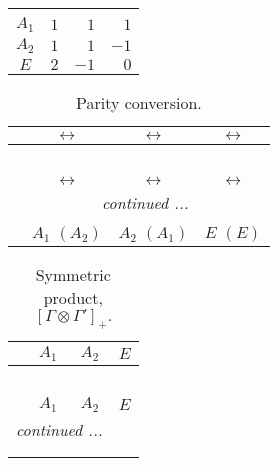 \documentclass[fleqn,10pt,landscape]{article}
\begin{document}
\begin{itemize}
\begin{center}
\begin{longtable}{c|rrr}
 \hline \hline
\multicolumn{3}{r}{} \\ \endlastfoot

$ A_{1} $ & $ 1 $ & $ 1 $ & $ 1 $ \\
$ A_{2} $ & $ 1 $ & $ 1 $ & $ -1 $ \\
$ E $ & $ 2 $ & $ -1 $ & $ 0 $ \\
\end{longtable}
\end{center}
\begin{center}
\renewcommand{\arraystretch}{1.0}
\begin{longtable}{cccc}
\caption{Parity conversion.}
 \\
 \hline \hline
 & $\leftrightarrow$ & $\leftrightarrow$ & $\leftrightarrow$ \\ \hline \endfirsthead

\multicolumn{3}{l}{\tablename\ \thetable{}} \\
 \hline \hline
 & $\leftrightarrow$ & $\leftrightarrow$ & $\leftrightarrow$ \\ \hline \endhead

 \hline \hline
\multicolumn{3}{r}{\footnotesize\it continued ...} \\ \endfoot

 \hline \hline
\multicolumn{3}{r}{} \\ \endlastfoot

 & $ A_{1}\,\,(A_{2}) $ & $ A_{2}\,\,(A_{1}) $ & $ E\,\,(E) $ \\
\end{longtable}
\end{center}
\begin{center}
\renewcommand{\arraystretch}{1.0}
\begin{longtable}{c|ccc}
\caption{Symmetric product, $[\Gamma\otimes\Gamma']_+.$}
 \\
 \hline \hline
 & $ A_{1} $ & $ A_{2} $ & $ E $ \\ \hline \endfirsthead

\multicolumn{3}{l}{\tablename\ \thetable{}} \\
 \hline \hline
 & $ A_{1} $ & $ A_{2} $ & $ E $ \\ \hline \endhead

 \hline \hline
\multicolumn{3}{r}{\footnotesize\it continued ...} \\ \endfoot

 \hline \hline
\multicolumn{3}{r}{} \\ \endlastfoot


\end{longtable}
\end{center}
\end{itemize}
\end{document}
